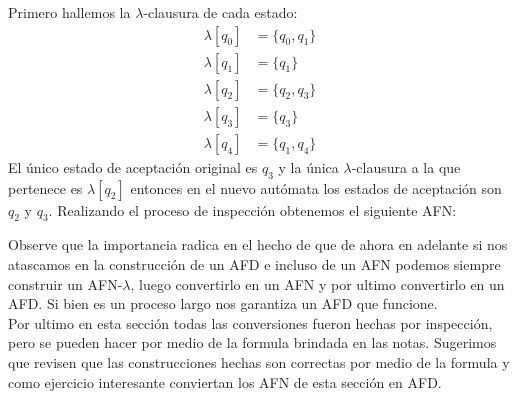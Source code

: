 Primero hallemos la $\lambda$-clausura de cada estado:
\begin{align*}
    \lambda[q_0]&=\{q_0,q_1\}\\
    \lambda[q_1]&=\{q_1\}\\
    \lambda[q_2]&=\{q_2,q_3\}\\
    \lambda[q_3]&=\{q_3\}\\ 
    \lambda[q_4]&=\{q_1,q_4\}
\end{align*}
El único estado de aceptación original es $q_3$ y la única $\lambda$-clausura a la que pertenece es $\lambda[q_2]$ entonces en el nuevo autómata los estados de aceptación son $q_2$ y $q_3$. Realizando el proceso de inspección obtenemos el siguiente AFN:
\begin{basedtikz}
\centering
\end{basedtikz}
Observe que la importancia radica en el hecho de que de ahora en adelante si nos atascamos en la construcción de un AFD e incluso de un AFN podemos siempre construir un AFN-$\lambda$, luego convertirlo en un AFN y por ultimo convertirlo en un AFD. Si bien es un proceso largo nos garantiza un AFD que funcione.\\
Por ultimo en esta sección todas las conversiones fueron hechas por inspección, pero se pueden hacer por medio de la formula brindada en las notas. Sugerimos que revisen que las construcciones hechas son correctas por medio de la formula y como ejercicio interesante conviertan los AFN de esta sección en AFD.

